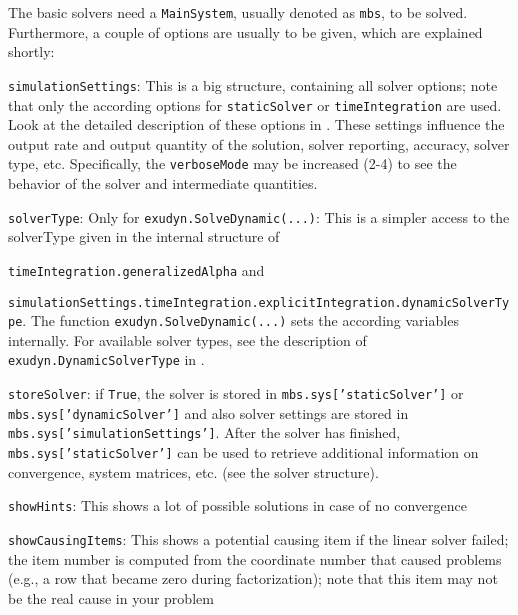 The basic solvers need a \texttt{MainSystem}, usually denoted as \texttt{mbs}, to be solved. Furthermore, a couple of options are usually to be given, which are explained shortly:
\bi
  \item \texttt{simulationSettings}: This is a big structure, containing all solver options; note that only the according options for \texttt{staticSolver} or \texttt{timeIntegration} are used. Look at the detailed description of these options in . These settings influence the output rate and output quantity of the solution, solver reporting, accuracy, solver type, etc. Specifically, the \texttt{verboseMode} may be increased (2-4) to see the behavior of the solver and intermediate quantities.
  \item \texttt{solverType}: Only for \texttt{exudyn.SolveDynamic(...)}: This is a simpler access to the solverType given in the internal structure of 
  \bi
  \item[] \texttt{timeIntegration.generalizedAlpha} and 
  \item[] \texttt{simulationSettings.timeIntegration.explicitIntegration.dynamicSolverType}.
  \ei
\ei
The function \texttt{exudyn.SolveDynamic(...)} sets the according variables internally. For available solver types, see the description of \texttt{exudyn.DynamicSolverType} in .
\bi
  \item \texttt{storeSolver}: if \texttt{True}, the solver is stored in \texttt{mbs.sys['staticSolver']} or \texttt{mbs.sys['dynamicSolver']} and also solver settings are stored in \texttt{mbs.sys['simulationSettings']}. After the solver has finished, \texttt{mbs.sys['staticSolver']} can be used to retrieve additional information on convergence, system matrices, etc. (see the solver structure).
  \item \texttt{showHints}: This shows a lot of possible solutions in case of no convergence
  \item \texttt{showCausingItems}: This shows a potential causing item if the linear solver failed; the item number is computed from the coordinate number that caused problems (e.g., a row that became zero during factorization); note that this item may not be the real cause in your problem
\ei

